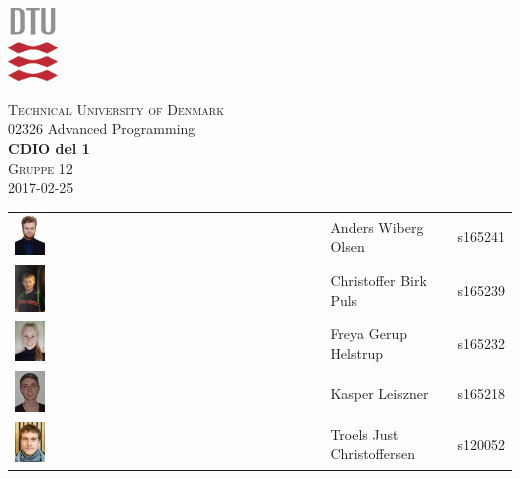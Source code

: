 \begin{titlepage}

\begin{center}
    \includegraphics[width=0.1\textwidth]{images/graphics/dtu.pdf}\par\vspace{1cm}

    {\scshape\LARGE Technical University of Denmark\\}
	\vspace{0.5cm}
    02326 Advanced Programming\\
	\vspace{0.8cm}
	{\huge\bfseries CDIO del 1\\}
	{\scshape\Large Gruppe 12\\}
	{\Large 2017-02-25\\}
	
	\vfill

    \begin{tabular}{m{1in} >{\centering\arraybackslash}m{2in} >{\centering\arraybackslash}m{1in}}
        \includegraphics[width=0.1\textwidth]{images/avatars/anders.jpg} & Anders Wiberg Olsen & s165241\\
        \includegraphics[width=0.1\textwidth]{images/avatars/Christoffer.jpg} & Christoffer Birk Puls & s165239\\
        \includegraphics[width=0.1\textwidth]{images/avatars/Freya.jpg} & Freya Gerup Helstrup & s165232\\
        \includegraphics[width=0.1\textwidth]{images/avatars/kasper.jpg} & Kasper Leiszner & s165218\\
        \includegraphics[width=0.1\textwidth]{images/avatars/troels.jpg} & Troels Just Christoffersen & s120052   \\
    \end{tabular}
    

\end{center}
\end{titlepage}
